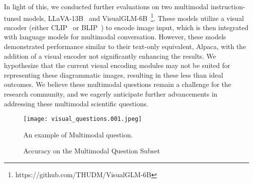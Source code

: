 \documentclass[11pt]{article}
\begin{document}
In light of this, we conducted further evaluations on two multimodal instruction-tuned models, LLaVA-13B~\cite{liu2023visual} and VisualGLM-6B~\cite{zeng2022glm}\footnote{https://github.com/THUDM/VisualGLM-6B}. These models utilize a visual encoder (either CLIP~\cite{radford2021learning} or BLIP~\cite{li2022blip}) to encode image input, which is then integrated with language models for multimodal conversation. However, these models demonstrated performance similar to their text-only equivalent, Alpaca, with the addition of a visual encoder not significantly enhancing the results. We hypothesize that the current visual encoding modules may not be suited for representing these diagrammatic images, resulting in these less than ideal outcomes. We believe these multimodal questions remain a challenge for the research community, and we eagerly anticipate further advancements in addressing these multimodal scientific questions.
\begin{figure}
    \centering
    \texttt{[image: visual\_questions.001.jpeg]}
    \caption{An example of Multimodal question.}
    \label{fig:visual_question}
\end{figure}

\begin{figure}
    \centering
    \clearpage{}\clearpage{}
    \vspace{-6ex}
    \caption{Accuracy on the Multimodal Question Subset}
    \label{fig:multimodal}
\end{figure}
\end{document}
